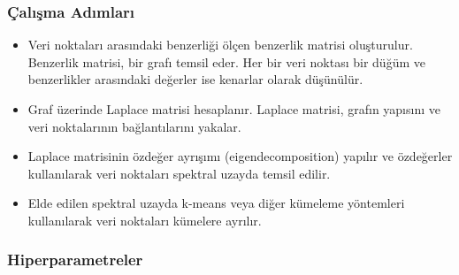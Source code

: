 \subsubsection{Çalışma Adımları}
\begin{itemize}
    \item Veri noktaları arasındaki benzerliği ölçen benzerlik matrisi oluşturulur. Benzerlik matrisi, bir grafı temsil eder. Her bir veri noktası bir düğüm ve benzerlikler arasındaki değerler ise kenarlar olarak düşünülür.
    \item Graf üzerinde Laplace matrisi hesaplanır. Laplace matrisi, grafın yapısını ve veri noktalarının bağlantılarını yakalar.
    \item Laplace matrisinin özdeğer ayrışımı (eigendecomposition) yapılır ve özdeğerler kullanılarak veri noktaları spektral uzayda temsil edilir.
    \item Elde edilen spektral uzayda k-means veya diğer kümeleme yöntemleri kullanılarak veri noktaları kümelere ayrılır.
\end{itemize}

\subsubsection{Hiperparametreler}

\begin{table}[h]
\centering
{\scriptsize\renewcommand{\arraystretch}{0.4}
{}}
\end{table}

